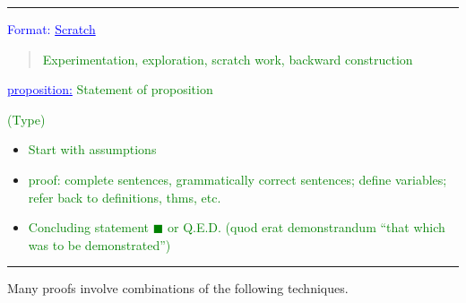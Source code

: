 \documentclass{article}
\newcommand{\tcB}{\textcolor{Blue}}
\begin{document}
	\vspace{.25cm}
	\hrule
	\vspace{.5cm}

	\tcB{Format:
	\underline{Scratch}}
	\begin{quote}
		\textcolor{Green}{Experimentation, exploration, scratch work, backward construction}
	\end{quote}
	\vspace{.25cm}
	\tcB{\underline{proposition:}} \textcolor{Green}{Statement of proposition}

	\vspace{.25cm}

	\tcB{}\textcolor{Green}{(Type)}
	\begin{itemize}
		\item \textcolor{Green}{Start with assumptions}
		\item \textcolor{Green}{proof: complete sentences, grammatically correct sentences; define variables; refer back to definitions, thms, etc.}
		\item \textcolor{Green}{Concluding statement $\blacksquare$ or Q.E.D. (quod erat demonstrandum ``that which was to be demonstrated'')}
	\end{itemize}
	\vspace{.25cm}
	\hrule
	\vspace{.5cm}
	\newpage
	\normalsize
	Many proofs involve combinations of the following techniques.
\end{document}
